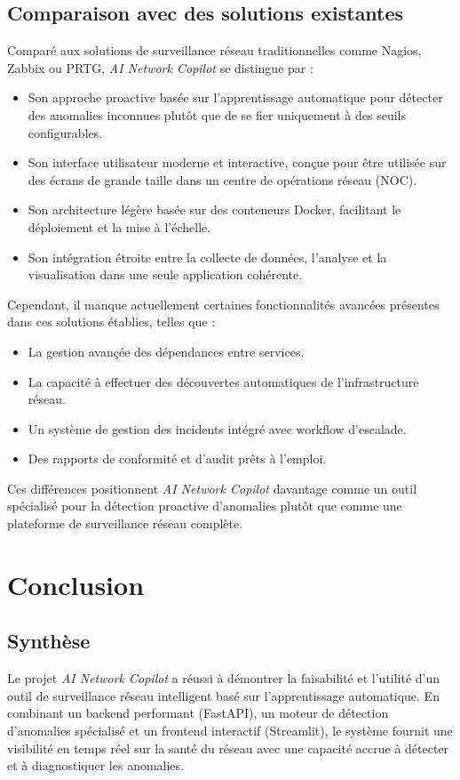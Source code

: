\documentclass[12pt,a4paper]{report}
\begin{document}
\section{Comparaison avec des solutions existantes}
Comparé aux solutions de surveillance réseau traditionnelles comme Nagios, Zabbix ou PRTG, \textit{AI Network Copilot} se distingue par :
\begin{itemize}
    \item Son approche proactive basée sur l'apprentissage automatique pour détecter des anomalies inconnues plutôt que de se fier uniquement à des seuils configurables.
    \item Son interface utilisateur moderne et interactive, conçue pour être utilisée sur des écrans de grande taille dans un centre de opérations réseau (NOC).
    \item Son architecture légère basée sur des conteneurs Docker, facilitant le déploiement et la mise à l'échelle.
    \item Son intégration étroite entre la collecte de données, l'analyse et la visualisation dans une seule application cohérente.
\end{itemize}

Cependant, il manque actuellement certaines fonctionnalités avancées présentes dans ces solutions établies, telles que :
\begin{itemize}
    \item La gestion avançée des dépendances entre services.
    \item La capacité à effectuer des découvertes automatiques de l'infrastructure réseau.
    \item Un système de gestion des incidents intégré avec workflow d'escalade.
    \item Des rapports de conformité et d'audit prêts à l'emploi.
\end{itemize}

Ces différences positionnent \textit{AI Network Copilot} davantage comme un outil spécialisé pour la détection proactive d'anomalies plutôt que comme une plateforme de surveillance réseau complète.

\chapter{Conclusion}
\section{Synthèse}
Le projet \textit{AI Network Copilot} a réussi à démontrer la faisabilité et l'utilité d'un outil de surveillance réseau intelligent basé sur l'apprentissage automatique. En combinant un backend performant (FastAPI), un moteur de détection d'anomalies spécialisé et un frontend interactif (Streamlit), le système fournit une visibilité en temps réel sur la santé du réseau avec une capacité accrue à détecter et à diagnostiquer les anomalies.
\end{document}
